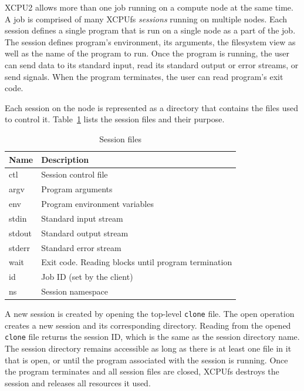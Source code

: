 \documentclass[10pt,conference,letterpaper]{IEEEtran}
\begin{document}
XCPU2 allows more than one job running on a compute node at the same time. A
job is comprised of many XCPUfs \textsl{sessions} running on multiple
nodes. Each session defines a single program that is run on a single node as
a part of the job. The session defines program's environment, its arguments,
the filesystem view as well as the name of the program to run. Once the
program is running, the user can send data to its standard input, read its
standard output or error streams, or send signals. When the program
terminates, the user can read program's exit code.

Each session on the node is represented as a directory that contains the
files used to control it. Table~\ref{tbl:XCPU2-session} lists the session
files and their purpose.

\begin{table}[ht]
\begin{center}
\begin{tabular}{lp{2.4in}}
    Name & Description\\
    \hline
    \ttfamily ctl & Session control file\\
    \ttfamily argv & Program arguments\\
    \ttfamily env & Program environment variables\\
    \ttfamily stdin & Standard input stream\\
    \ttfamily stdout & Standard output stream\\
    \ttfamily stderr & Standard error stream\\
    \ttfamily wait & Exit code. Reading blocks until program termination\\
    \ttfamily id & Job ID (set by the client)\\
    \ttfamily ns & Session namespace\\
\end{tabular}
\caption{Session files}
\label{tbl:XCPU2-session}
\end{center}
\end{table}

A new session is created by opening the top-level \texttt{clone} file. The
open operation creates a new session and its corresponding directory.
Reading from the opened \texttt{clone} file returns the session ID, which is
the same as the session directory name. The session directory remains
accessible as long as there is at least one file in it that is open, or
until the program associated with the session is running. Once the program
terminates and all session files are closed, XCPUfs destroys the session and
releases all resources it used.
\end{document}
